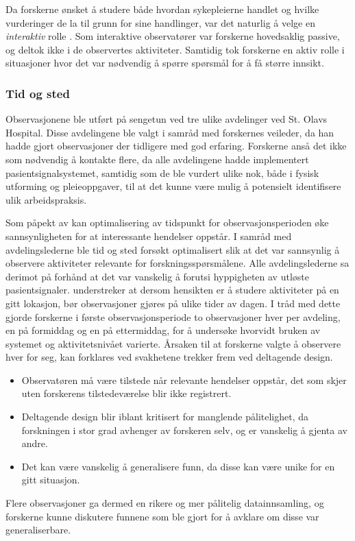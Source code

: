 \noindent
Da forskerne ønsket å studere både hvordan sykepleierne handlet og  hvilke vurderinger de la til grunn for sine handlinger, var det naturlig å velge en \textit{interaktiv} rolle \citep{Tjora}. Som interaktive observatører var forskerne hovedsaklig passive, og deltok ikke i de observertes aktiviteter. Samtidig tok forskerne en aktiv rolle i situasjoner hvor det var nødvendig å spørre spørsmål for å få større innsikt.
 
\subsubsection{Tid og sted}
Observasjonene ble utført på sengetun ved tre ulike avdelinger ved St. Olavs Hospital. Disse avdelingene ble valgt i samråd med forskernes veileder, da han hadde gjort observasjoner der tidligere med god erfaring. Forskerne anså det ikke som nødvendig å kontakte flere, da alle avdelingene hadde implementert pasientsignalsystemet, samtidig som de ble vurdert ulike nok, både i fysisk utforming og pleieoppgaver, til at det kunne være mulig å potensielt identifisere ulik arbeidspraksis.
 
\noindent
Som påpekt av \citet{Millen00} kan optimalisering av tidspunkt for observasjonsperioden øke sannsynligheten for at interessante hendelser oppstår. I samråd med avdelingslederne ble tid og sted forsøkt optimalisert slik at det var sannsynlig å observere aktiviteter relevante for forskningsspørsmålene. Alle avdelingslederne sa derimot på forhånd at det var vanskelig å forutsi hyppigheten av utløste pasientsignaler. \citet{Blomberg93} understreker at dersom hensikten er å studere aktiviteter på en gitt lokasjon, bør observasjoner gjøres på ulike tider av dagen. I tråd med dette gjorde forskerne i første observasjonsperiode to observasjoner hver per avdeling, en på formiddag og en på ettermiddag, for å undersøke hvorvidt bruken av systemet og aktivitetsnivået varierte. Årsaken til at forskerne valgte å observere hver for seg, kan forklares ved svakhetene \citet{Oates} trekker frem ved deltagende design. 
\begin{itemize}
\item Observatøren må være tilstede når relevante hendelser oppstår, det som skjer uten forskerens tilstedeværelse blir ikke registrert.
\item Deltagende design blir iblant kritisert for manglende pålitelighet, da forskningen i stor grad avhenger av forskeren selv, og er vanskelig å gjenta av andre.
\item Det kan være vanskelig å generalisere funn, da disse kan være unike for en gitt situasjon.
\end{itemize}
\noindent
Flere observasjoner ga dermed en rikere og mer pålitelig datainnsamling, og forskerne kunne diskutere funnene som ble gjort for å avklare om disse var generaliserbare.


